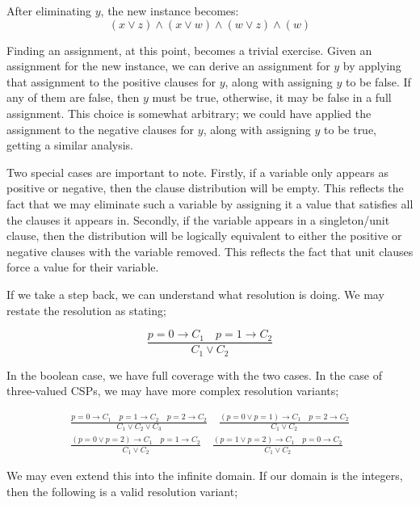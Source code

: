 After eliminating \(y\), the new instance becomes:
\begin{equation}
(x \vee z) \wedge (x \vee w) \wedge (w \vee z) \wedge (w)
\end{equation}

Finding an assignment, at this point, becomes a trivial exercise. Given an assignment for the new instance, we can derive an assignment for $y$ by applying that assignment to the positive clauses for $y$, along with assigning $y$ to be false. If any of them are false, then $y$ must be true, otherwise, it may be false in a full assignment. This choice is somewhat arbitrary; we could have applied the assignment to the negative clauses for $y$, along with assigning $y$ to be true, getting a similar analysis.

Two special cases are important to note. Firstly, if a variable only appears as positive or negative, then the clause distribution will be empty. This reflects the fact that we may eliminate such a variable by assigning it a value that satisfies all the clauses it appears in. Secondly, if the variable appears in a singleton/unit clause, then the distribution will be logically equivalent to either the positive or negative clauses with the variable removed. This reflects the fact that unit clauses force a value for their variable.

If we take a step back, we can understand what resolution is doing. We may restate the resolution as stating;

\begin{equation}\label{equation:binary-resolution-2}
\frac{p = 0 \rightarrow C_1 \quad p = 1 \rightarrow C_2}{C_1 \lor C_2}
\end{equation}

In the boolean case, we have full coverage with the two cases. In the case of three-valued CSPs, we may have more complex resolution variants;

\begin{align}
\frac{p = 0 \rightarrow C_1 \quad p = 1 \rightarrow C_2 \quad p = 2 \rightarrow C_2}{C_1 \lor C_2 \lor C_3} \quad
\frac{(p = 0 \vee p = 1) \rightarrow C_1 \quad p = 2 \rightarrow C_2}{C_1 \lor C_2} \nonumber \\
\frac{(p = 0 \vee p = 2) \rightarrow C_1 \quad p = 1 \rightarrow C_2}{C_1 \lor C_2} \quad
\frac{(p = 1 \vee p = 2) \rightarrow C_1 \quad p = 0 \rightarrow C_2}{C_1 \lor C_2} \label{equation:binary-resolution-3-all}
\end{align}

We may even extend this into the infinite domain. If our domain is the integers, then the following is a valid resolution variant;

